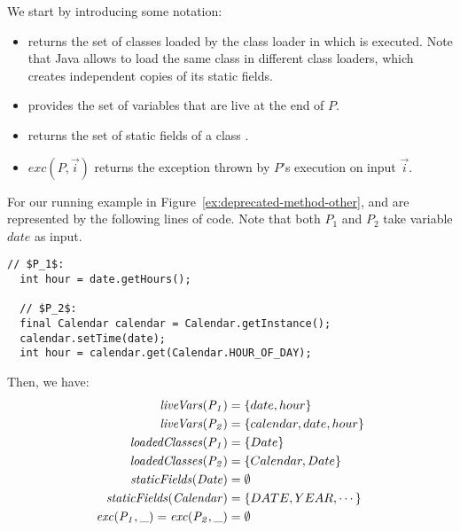 \documentclass[sigconf,review,anonymous]{acmart}
\begin{document}
We start by introducing some notation:
\begin{itemize}
\item {} returns the set of classes loaded by the class loader
  in which  is executed. Note that Java allows to load the same class
in different class loaders, which creates independent copies of its
static fields.
\item {} provides the set of variables that are live
at the end of $P$. %
\item {} returns
  the set of static fields of a class .
\item $exc(P, \vec{i})$ returns the exception thrown by $P$'s execution on input $\vec{i}$.  
\end{itemize}  

\begin{example}\label{ex:defs}
  For our running example in Figure~\ref{ex:deprecated-method-other},
   and  are represented by the following lines of code. Note that
  both $P_1$ and $P_2$ take variable $date$ as input.

\begin{lstlisting}[mathescape=true,showstringspaces=false]
  // $P_1$:
  int hour = date.getHours();

  // $P_2$:
  final Calendar calendar = Calendar.getInstance();
  calendar.setTime(date);
  int hour = calendar.get(Calendar.HOUR_OF_DAY);
\end{lstlisting}
%
Then, we have:
\[
\begin{aligned}[t]
  \mathit{{liveVars(P_1)}} &= \{date, hour\}\\
  \mathit{{liveVars(P_2)}} &= \{calendar, date, hour\}\\  
  \mathit{{loadedClasses(P_1)}} &= \{Date\} \\
  \mathit{{loadedClasses(P_2)}} &= \{Calendar, Date\} \\  
  \mathit{{staticFields(Date)}} &= \emptyset\\
  \mathit{{staticFields(Calendar)}} &= \{DATE, YEAR, \cdots\}\\
  \mathit{{exc(P_1, \_)}}=\mathit{{exc(P_2, \_)}} &=\emptyset
\end{aligned}
\]
\end{example}

\end{document}
